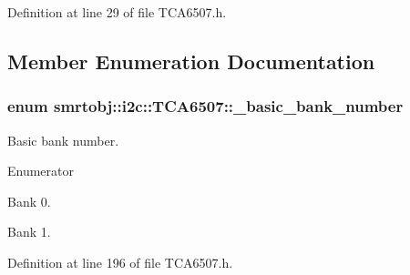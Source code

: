 Definition at line 29 of file T\+C\+A6507.\+h.



\subsection{Member Enumeration Documentation}
\hypertarget{classsmrtobj_1_1i2c_1_1_t_c_a6507_a416c966fabb333b9b60a2e62f674e3ec}{}
\subsubsection[{\+\_\+basic\+\_\+bank\+\_\+number}]{\setlength{\rightskip}{0pt plus 5cm}enum {\bf smrtobj\+::i2c\+::\+T\+C\+A6507\+::\+\_\+basic\+\_\+bank\+\_\+number}}\label{classsmrtobj_1_1i2c_1_1_t_c_a6507_a416c966fabb333b9b60a2e62f674e3ec}
Basic bank number. \begin{Desc}
\item[Enumerator]\par
\begin{description}
\item[{\em 
\hypertarget{classsmrtobj_1_1i2c_1_1_t_c_a6507_a416c966fabb333b9b60a2e62f674e3eca375a3de4e50bd869dfc248e139974527}{}B\+A\+N\+K0\label{classsmrtobj_1_1i2c_1_1_t_c_a6507_a416c966fabb333b9b60a2e62f674e3eca375a3de4e50bd869dfc248e139974527}
}]Bank 0. \item[{\em 
\hypertarget{classsmrtobj_1_1i2c_1_1_t_c_a6507_a416c966fabb333b9b60a2e62f674e3eca45b9000ef40886cbb3a6ce9053d4e246}{}B\+A\+N\+K1\label{classsmrtobj_1_1i2c_1_1_t_c_a6507_a416c966fabb333b9b60a2e62f674e3eca45b9000ef40886cbb3a6ce9053d4e246}
}]Bank 1. \end{description}
\end{Desc}


Definition at line 196 of file T\+C\+A6507.\+h.

\hypertarget{classsmrtobj_1_1i2c_1_1_t_c_a6507_a2b771c2f4975065352874dc67f7d701d}{}
